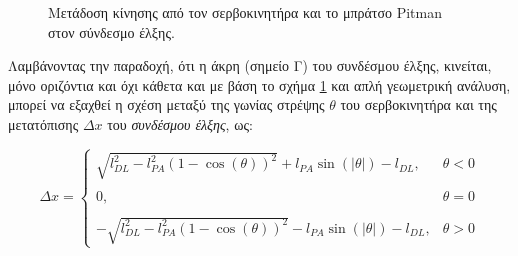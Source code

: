 \bigskip
\begin{figure}[!ht]
	\centering
	\centering
	\caption{Μετάδοση κίνησης από τον σερβοκινητήρα και το μπράτσο Pitman στον σύνδεσμο έλξης.}
	\label{fig:drag_link_analysis}	
\end{figure}

\bigskip
Λαμβάνοντας την παραδοχή, ότι η άκρη (σημείο Γ) του συνδέσμου έλξης, κινείται, μόνο οριζόντια και όχι κάθετα και με βάση το σχήμα \ref{fig:drag_link_analysis} και απλή γεωμετρική ανάλυση, μπορεί να εξαχθεί η  σχέση μεταξύ της γωνίας στρέψης $\theta$ του σερβοκινητήρα και της μετατόπισης $\Delta x$ του \textit{συνδέσμου έλξης}, ως:

\begin{equation}
	\label{eq:drag_link_displacement}
	\Delta x =
	\begin{cases}
		\sqrt{l_{DL}^2 - l_{PA}^2(1-\cos(\theta))^2} + l_{PA} \sin(|\theta|) - l_{DL},  &\theta < 0\\ \\
	0, &\theta = 0\\ \\ 
	-\sqrt{l_{DL}^2 - l_{PA}^2(1-\cos(\theta))^2} - l_{PA} \sin(|\theta|) - l_{DL}, &\theta > 0
	\end{cases}
\end{equation}

